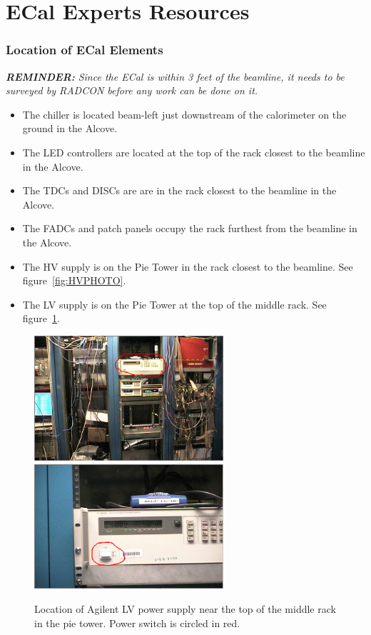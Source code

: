 \documentclass[12pt]{article}
\begin{document}
\newpage

\part{ECal Experts Resources}

   \section{Location of ECal Elements}

   {\em{\bf REMINDER:} Since the ECal is within 3 feet of the beamline, it needs to be surveyed by RADCON before any work can be done on it.}
   {\footnotesize
\begin{itemize}
\item
The chiller is located beam-left just downstream of the calorimeter on the ground in the Alcove.
\item
The LED controllers are located at the top of the rack closest to the beamline in the Alcove.
\item
The TDCs and DISCs are are in the rack closest to the beamline in the Alcove.
\item
The FADCs and patch panels occupy the rack furthest from the beamline in the Alcove.
\item
    The HV supply is on the Pie Tower in the rack closest to the beamline.  See figure~\ref{fig:HVPHOTO}.
\item
    The LV supply is on the Pie Tower at the top of the middle rack. See figure~\ref{fig:LVPHOTO}.
\end{itemize}
}
\begin{figure}[htbp]\centering
    \includegraphics[width=7cm]{pics/ECALLVPHOTO2.png}
    \includegraphics[width=7cm]{pics/ECALLVPHOTO.png}
    \caption{Location of Agilent LV power supply near the top of the middle rack in the pie tower.  Power switch is circled in red.\label{fig:LVPHOTO}}
\end{figure}
\end{document}
